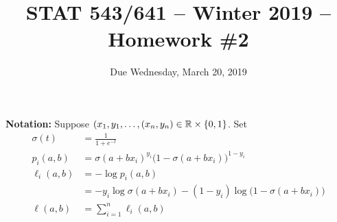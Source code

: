 \documentclass[12pt]{exam}
\begin{document}
\title{STAT 543/641 -- Winter 2019 -- Homework \#2}

\date{Due Wednesday, March 20, 2019}
\maketitle


\textbf{Notation:} Suppose $(x_1,y_1,\ldots,(x_n, y_n)\in\mathbb{R}\times \{0,1\}$. Set
\begin{align*}
    \sigma(t) &= \frac1{1+e^{-t}}\\[2ex]
    p_i(a,b) &= \sigma(a + bx_i)^{y_i}\big(1 - \sigma(a + bx_i)\big)^{1-y_i}\\[2ex]
    \ell_i(a,b) &= -\log p_i(a,b)\\
    &= -y_i\log\sigma(a + bx_i) - (1-y_i)\log\big(1-\sigma(a + bx_i)\big)\\[2ex]
    \ell(a,b) &= \sum_{i=1}^n \ell_i(a,b)
\end{align*}
\end{document}

